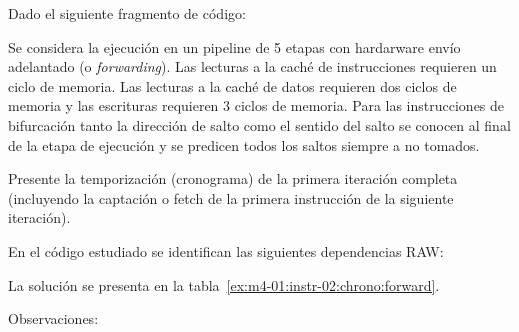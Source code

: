 \begin{acexercise}\end{acexercise}
\label{ex:m4-01:instr-02}

Dado el siguiente fragmento de código:



Se considera la ejecución en un pipeline de 5 etapas con hardarware envío adelantado
(o \emph{forwarding}). Las lecturas a la caché de instrucciones requieren un ciclo de
memoria. Las lecturas a la caché de datos requieren dos ciclos de memoria y las
escrituras requieren 3 ciclos de memoria. Para las instrucciones de bifurcación
tanto la dirección de salto como el sentido del salto se conocen al final de la
etapa de ejecución y se predicen todos los saltos siempre a no tomados.

Presente la temporización (cronograma) de la primera iteración completa (incluyendo la captación o fetch
de la primera instrucción de la siguiente iteración).

\begin{acsolution}\end{acsolution}

En el código estudiado se identifican las siguientes dependencias RAW:


La solución se presenta en la tabla~\ref{ex:m4-01:instr-02:chrono:forward}.

Observaciones:


